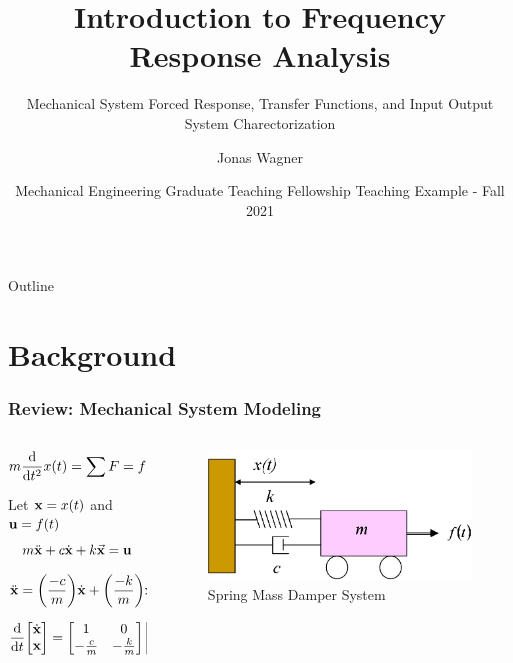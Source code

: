 \documentclass[aspectratio=169]{beamer}
\title[Frequency Response Analysis]{Introduction to Frequency Response Analysis}
\subtitle{Mechanical System Forced Response, Transfer Functions, and Input Output System Charectorization}
\author{Jonas Wagner}
\institute[UTDallas]{Univeristy of Texas at Dallas}
\date[ME GTF Interview - Fall 2021]{Mechanical Engineering Graduate Teaching Fellowship Teaching Example - Fall 2021}
\begin{document}
	
\begin{frame}
	\titlepage
\end{frame}


\begin{frame}{Outline}
	\tableofcontents
	\note{

	}
\end{frame}

\section{Background}
\begin{frame}
	\frametitle{Review: Mechanical System Modeling}
	\begin{columns}
		\begin{column}{0.5 \textwidth}
			\[
				m \dv{t^2} x(t) 
				= \sum F 
				= f(t) - b \dv{t} x(t) - k x(t)
			\]

			Let $\vb{x} = x(t)$ and $\vb{u} = f(t)$
			\[
				m \ddot{\vb{x}} + c \dot{\vb{x}} + k \va{x} = \vb{u}
			\]
			\[
				\ddot{\vb{x}} 
				= \qty(\frac{-c}{m}) \dot{\vb{x}} + \qty(\frac{-k}{m}) \vb{x} + \qty(\cfrac{1}{m}) \vb{u}
			\]
			\[
				\dv{t} \mqty[
					\dot{\vb{x}}\\ 
					\vb{x}
				 ] = 
				\mqty[
					1 &0\\
					-\frac{c}{m} &-\frac{k}{m}
					] 
				\mqty[
					\dot{\vb{x}}\\
					\vb{x}
				]
				+ \mqty[
					0\\
					\frac{1}{m}
				]
				\mqty[\vb{u}]
			\]
		\end{column}
		\begin{column}{0.375 \textwidth}
			\begin{figure}[]
				\includegraphics[width=\textwidth]{Images/SpringMassDamper_cartSystem.png}
				Spring Mass Damper System \cite{ctms_engin_umich_SystemModeling}
			\end{figure}
		\end{column}
	\end{columns}
	\note{

	}
\end{frame}
\end{document}
